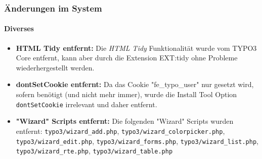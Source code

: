 \begin{frame}[fragile]
	\frametitle{Änderungen im System}
	\framesubtitle{Diverses}

	\begin{itemize}

		\item \textbf{HTML Tidy entfernt:}\newline
			\small
				Die \textit{HTML Tidy} Funktionalität wurde vom TYPO3 Core entfernt, kann aber durch die Extension EXT:tidy ohne Probleme wiederhergestellt werden.
			\normalsize

		\item \textbf{dontSetCookie entfernt:}\newline
			\small
				Da das Cookie "fe\_typo\_user" nur gesetzt wird, sofern benötigt (und nicht mehr immer), wurde die Install Tool Option \texttt{dontSetCookie} irrelevant und daher entfernt.
			\normalsize

		\item \textbf{"Wizard" Scripts entfernt:}\newline
			\small
				Die folgenden "Wizard" Scripts wurden entfernt:
				\texttt{typo3/wizard\_add.php}, \texttt{typo3/wizard\_colorpicker.php}, \texttt{typo3/wizard\_edit.php}, \texttt{typo3/wizard\_forms.php}, \texttt{typo3/wizard\_list.php}, \texttt{typo3/wizard\_rte.php}, \texttt{typo3/wizard\_table.php}
			\normalsize

	\end{itemize}
	
\end{frame}


